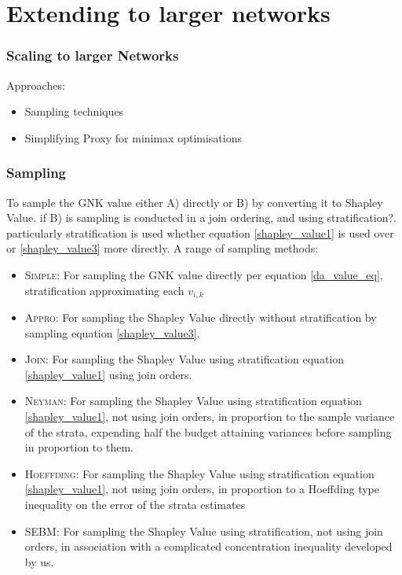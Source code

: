 \documentclass{beamer}
\begin{document}
\section{Extending to larger networks}

\begin{frame}
\frametitle{Scaling to larger Networks}
Approaches:
\begin{itemize}
\item	Sampling techniques
\item	Simplifying Proxy for minimax optimisations
\end{itemize}
\end{frame}

\begin{frame}
\frametitle{Sampling}
To sample the GNK value either A) directly or B) by converting it to Shapley Value.
if B) is sampling is conducted in a join ordering, and using stratification?.
particularly stratification is used whether equation \ref{shapley_value1} is used over or \ref{shapley_value3} more directly.
A range of sampling methods:

\begin{itemize}
\item	\textsc{Simple}: For sampling the GNK value directly per equation \ref{da_value_eq}, stratification approximating each $v_{i,k}$ 
\item	\textsc{Appro}: For sampling the Shapley Value directly without stratification by sampling equation \ref{shapley_value3}. \cite{DBLP:journals/cor/CastroGT09}
\item	\textsc{Join}: For sampling the Shapley Value using stratification equation \ref{shapley_value1} using join orders. \cite{CASTRO2017180}
\item	\textsc{Neyman}: For sampling the Shapley Value using stratification equation \ref{shapley_value1}, not using join orders, in proportion to the sample variance of the strata, expending half the budget attaining variances before sampling in proportion to them. \cite{CASTRO2017180,1938.10503378}
\item	\textsc{Hoeffding}: For sampling the Shapley Value using stratification equation \ref{shapley_value1}, not using join orders, in proportion to a Hoeffding type inequality on the error of the strata estimates \cite{2013arXiv1306.4265M}
\item	\textsc{SEBM}: For sampling the Shapley Value using stratification, not using join orders, in association with a complicated concentration inequality developed by us.
\end{itemize}
\end{frame}
\end{document}
